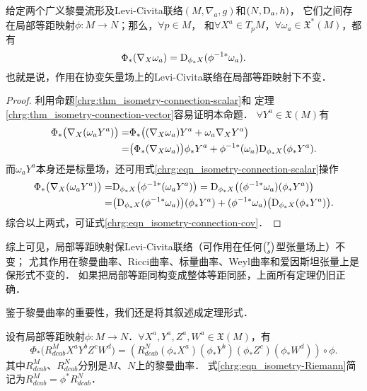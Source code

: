 \begin{proposition}\label{chrg:thm_isometry-connection-cov}
    给定两个广义黎曼流形及Levi-Civita联络$(M,\nabla_a,g)$和$(N,{\rm D}_a,h)$，
    它们之间存在局部等距映射$\phi:M\to N$；那么，$\forall p\in M$，
    和$\forall X^a \in T_{p}M$，$ \forall \omega_a \in \mathfrak{X}^{*}(M)$，都有
    \begin{equation}\label{chrg:eqn_isometry-connection-cov}
    \Phi_{*} (\nabla _X \omega_a) = {\rm D}_ {\phi_* X} ({\phi^{-1*}}\omega_a) .
    \end{equation}
    也就是说，作用在协变矢量场上的Levi-Civita联络在局部等距映射下不变．
\end{proposition}
\begin{proof}
    利用命题\ref{chrg:thm_isometry-connection-scalar}和
    定理\ref{chrg:thm_isometry-connection-vector}容易证明本命题．
    $\forall Y^a \in \mathfrak{X}(M)$有
    \begin{align*}
        \Phi_{*} \bigl(\nabla _X (\omega_a Y^a) \bigr) =&
        \Phi_{*} \bigl((\nabla _X \omega_a )Y^a + \omega_a \nabla _X  Y^a\bigr) \\
        =&\bigl(\Phi_{*} (\nabla _X \omega_a ) \bigr)\phi_{*}Y^a
        + \phi^{-1*}(\omega_a) {\rm D} _{\phi_* X}  (\phi_* Y^a) .
    \end{align*}
    而$\omega_a Y^a$本身还是标量场，还可用式\eqref{chrg:eqn_isometry-connection-scalar}操作
    \begin{align*}
       \Phi_{*} \bigl(\nabla _X (\omega_a Y^a) \bigr) =&  {\rm D}_ {\phi_* X} \bigl({\phi^{-1*}} (\omega_a Y^a)\bigr)
       ={\rm D}_ {\phi_* X} \bigl((\phi^{-1*}\omega_a ) (\phi_{*}Y^a)\bigr) \\
       =&\bigl( {\rm D}_ {\phi_* X} (\phi^{-1*}\omega_a ) \bigr) (\phi_{*}Y^a)
       +(\phi^{-1*}\omega_a ) \bigl({\rm D}_ {\phi_* X}  (\phi_{*}Y^a)\bigr) .
    \end{align*}
    综合以上两式，可证式\eqref{chrg:eqn_isometry-connection-cov}．
\end{proof}
综上可见，局部等距映射保Levi-Civita联络（可作用在任何$\binom{r}{s}$型张量场上）不变；
尤其作用在黎曼曲率、Ricci曲率、标量曲率、Weyl曲率和爱因斯坦张量上是保形式不变的．
如果把{\kaishu 局部等距同构}变成整体{\kaishu 等距同胚}，上面所有定理仍旧正确．

鉴于黎曼曲率的重要性，我们还是将其叙述成定理形式．
\begin{theorem}\label{chrg:thm_isometry-Riemann}
    设有局部等距映射$\phi:M\to N$．$\forall X^a,Y^a,Z^a,W^a\in \mathfrak{X}(M)$，有
    \begin{equation}\label{chrg:eqn_isometry-Riemann}
        \Phi_{*}\bigl(R_{dcab}^M X^a Y^b Z^c W^d\bigr) = \left(R^N_{dcab}
        (\phi_{*} X^a) (\phi_{*} Y^b) (\phi_{*} Z^c) (\phi_{*} W^d)\right)\circ \phi .
    \end{equation}
    其中$R_{dcab}^M$、$R_{dcab}^N$分别是$M$、$N$上的黎曼曲率．
    式\eqref{chrg:eqn_isometry-Riemann}简记为$R_{dcab}^M=\phi^* R_{dcab}^N$．
\end{theorem}


